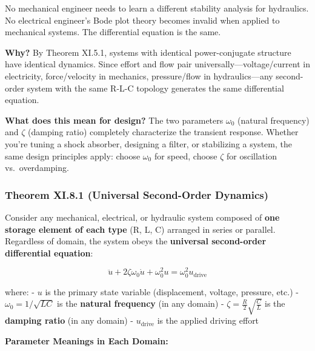\documentclass[
]{article}
\begin{document}
No mechanical engineer needs to learn a different stability analysis for
hydraulics. No electrical engineer's Bode plot theory becomes invalid
when applied to mechanical systems. The differential equation is the
same.

\textbf{Why?} By Theorem XI.5.1, systems with identical power-conjugate
structure have identical dynamics. Since effort and flow pair
universally---voltage/current in electricity, force/velocity in
mechanics, pressure/flow in hydraulics---any second-order system with
the same R-L-C topology generates the same differential equation.

\textbf{What does this mean for design?} The two parameters \(\omega_0\)
(natural frequency) and \(\zeta\) (damping ratio) completely
characterize the transient response. Whether you're tuning a shock
absorber, designing a filter, or stabilizing a system, the same design
principles apply: choose \(\omega_0\) for speed, choose \(\zeta\) for
oscillation vs.~overdamping.

\subsubsection{Theorem XI.8.1 (Universal Second-Order
Dynamics)}\label{theorem-xi.8.1-universal-second-order-dynamics}

Consider any mechanical, electrical, or hydraulic system composed of
\textbf{one storage element of each type} (R, L, C) arranged in series
or parallel. Regardless of domain, the system obeys the
\textbf{universal second-order differential equation}:

\[\boxed{\ddot{u} + 2\zeta\omega_0\dot{u} + \omega_0^2 u = \omega_0^2 u_{\text{drive}}}\]

where: - \(u\) is the primary state variable (displacement, voltage,
pressure, etc.) - \(\omega_0 = 1/\sqrt{LC}\) is the \textbf{natural
frequency} (in any domain) - \(\zeta = \frac{R}{2}\sqrt{\frac{C}{L}}\)
is the \textbf{damping ratio} (in any domain) - \(u_{\text{drive}}\) is
the applied driving effort

\textbf{Parameter Meanings in Each Domain:}
\end{document}
